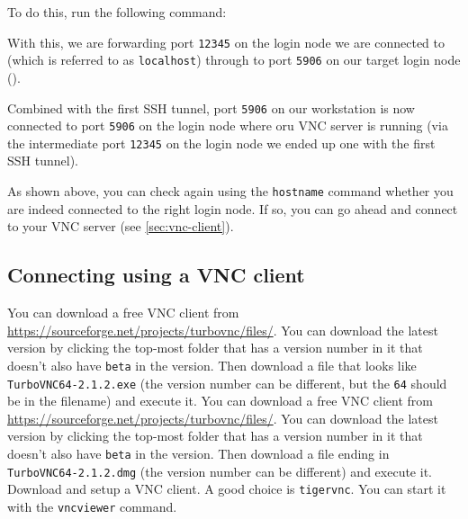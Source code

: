 To do this, run the following command:

\begin{prompt}
\end{prompt}

With this, we are forwarding port \lstinline|12345| on the login node we are connected to (which is referred
to as \lstinline|localhost|) through to port \lstinline|5906| on our target login node (\texttt{\loginhost}).

Combined with the first SSH tunnel, port \lstinline|5906| on our workstation is now connected to
port \lstinline|5906| on the login node where oru VNC server is running (via the intermediate port \lstinline|12345|
on the login node we ended up one with the first SSH tunnel).


As shown above, you can check again using the \lstinline|hostname| command whether you are indeed connected
to the right login node. If so, you can go ahead and connect to your VNC server (see \autoref{sec:vnc-client}).

\subsection{Connecting using a VNC client}
\label{sec:vnc-client}

\ifwindows

You can download a free VNC client from \url{https://sourceforge.net/projects/turbovnc/files/}.
You can download the latest version by clicking the top-most folder that has a version number
in it that doesn't also have \lstinline|beta| in the version. Then download a file that looks like
\lstinline|TurboVNC64-2.1.2.exe| (the version number can be different, but the \lstinline|64|
should be in the filename) and execute it.
\fi
\ifmac
You can download a free VNC client from \url{https://sourceforge.net/projects/turbovnc/files/}.
You can download the latest version by clicking the top-most folder that has a version number
in it that doesn't also have \lstinline|beta| in the version. Then download a file ending in
\lstinline|TurboVNC64-2.1.2.dmg| (the version number can be different) and execute it.
\fi
\iflinux
Download and setup a VNC client. A good choice is \lstinline|tigervnc|. You can start
it with the \lstinline|vncviewer| command.
\fi


